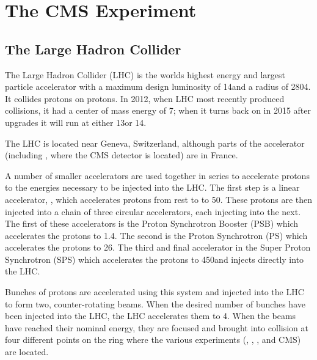 
\chapter{The CMS Experiment}
\label{experiment_chapter}

\section{The Large Hadron Collider}
\label{lhc_section}

The Large Hadron Collider (LHC) is the worlds highest energy and largest
particle accelerator with a maximum design luminosity of 14\TeV and a radius of
2804\meters \cite{bruning2004}. It collides protons on protons. In 2012, when
LHC most recently produced collisions, it had a center of mass energy of 7\TeV;
when it turns back on in 2015 after upgrades it will run at either 13\TeV or
14\TeV.

The LHC is located near Geneva, Switzerland, although parts of the accelerator
(including \pointfive, where the CMS detector is located) are in France.

A number of smaller accelerators are used together in series to accelerate
protons to the energies necessary to be injected into the LHC. The first step
is a linear accelerator, \linactwo, which accelerates protons from rest to to
50\MeV. These protons are then injected into a chain of three circular
accelerators, each injecting into the next. The first of these accelerators is
the Proton Synchrotron Booster (PSB) which accelerates the protons to 1.4\GeV.
The second is the Proton Synchrotron (PS) which accelerates the protons to
26\GeV. The third and final accelerator in the Super Proton Synchrotron (SPS)
which accelerates the protons to 450\GeV and injects directly into the LHC.

Bunches of protons are accelerated using this system and injected into the LHC
to form two, counter-rotating beams. When the desired number of bunches have
been injected into the LHC, the LHC accelerates them to 4\TeV. When the beams
have reached their nominal energy, they are focused and brought into collision
at four different points on the ring where the various experiments (\ALICE,
\ATLAS, \LHCB, and CMS) are located.
